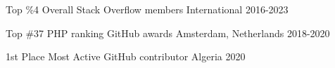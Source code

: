 



\begin{cvhonors}

  \cvhonor
    {Top \%4} %
    {Overall Stack Overflow members} %
    {International} %
    {2016-2023} %

  \cvhonor
    {Top \#37} %
    {PHP ranking GitHub awards} %
    {Amsterdam, Netherlands} %
    {2018-2020} %

\end{cvhonors}




\begin{cvhonors}

  \cvhonor
    {1st Place} %
    {Most Active GitHub contributor} %
    {Algeria} %
    {2020} %

\end{cvhonors}
